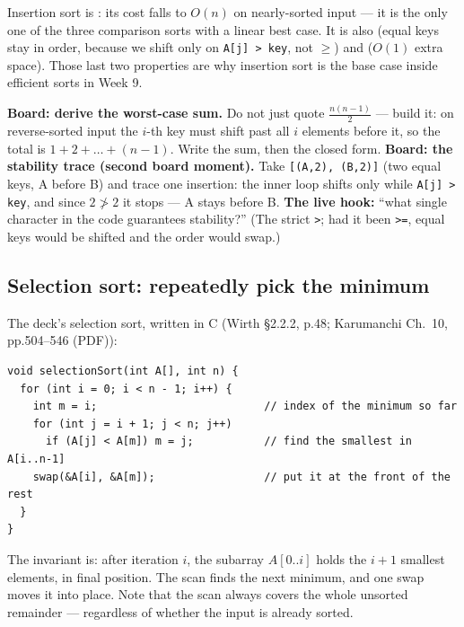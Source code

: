 \documentclass[11pt]{article}
\begin{document}
Insertion sort is : its cost falls to $O(n)$ on nearly-sorted input --- it is the only one of the three comparison sorts with a linear best case. It is also  (equal keys stay in order, because we shift only on \texttt{A[j] > key}, not $\ge$) and  ($O(1)$ extra space). Those last two properties are why insertion sort is the base case inside efficient sorts in Week 9.

\textbf{Board: derive the worst-case sum.} Do not just quote $\frac{n(n-1)}{2}$ --- build it: on reverse-sorted input the $i$-th key must shift past all $i$ elements before it, so the total is $1 + 2 + \dots + (n-1)$. Write the sum, then the closed form. \textbf{Board: the stability trace (second board moment).} Take \texttt{[(A,2), (B,2)]} (two equal keys, A before B) and trace one insertion: the inner loop shifts only while \texttt{A[j] > key}, and since $2 \not> 2$ it stops --- A stays before B. \textbf{The live hook:} ``what single character in the code guarantees stability?'' (The strict \texttt{>}; had it been \texttt{>=}, equal keys would be shifted and the order would swap.)

\subsection{Selection sort: repeatedly pick the minimum}

The deck's selection sort, written in C (Wirth \S2.2.2, p.48; Karumanchi Ch.~10, pp.504--546 (PDF)):

{\footnotesize
\begin{verbatim}
void selectionSort(int A[], int n) {
  for (int i = 0; i < n - 1; i++) {
    int m = i;                          // index of the minimum so far
    for (int j = i + 1; j < n; j++)
      if (A[j] < A[m]) m = j;           // find the smallest in A[i..n-1]
    swap(&A[i], &A[m]);                 // put it at the front of the rest
  }
}
\end{verbatim}
}

The invariant is: after iteration $i$, the subarray $A[0..i]$ holds the $i+1$ smallest elements, in final position. The scan finds the next minimum, and one swap moves it into place. Note that the scan always covers the whole unsorted remainder --- regardless of whether the input is already sorted.
\end{document}
